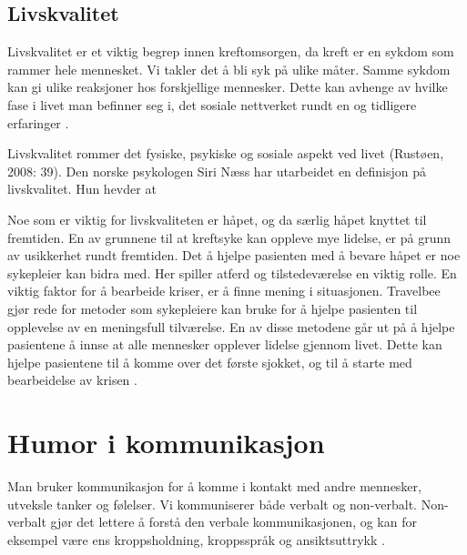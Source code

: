 \subsection{Livskvalitet}

Livskvalitet er et viktig begrep innen kreftomsorgen, da kreft er en sykdom som
rammer hele mennesket. Vi takler det å bli syk på ulike måter. Samme sykdom kan
gi ulike reaksjoner hos forskjellige mennesker. Dette kan avhenge av hvilke
fase i livet man befinner seg i, det sosiale nettverket rundt en og tidligere
erfaringer \cite[s.~39]{rustoen2008}.

Livskvalitet rommer det fysiske, psykiske og sosiale aspekt ved livet (Rustøen,
2008: 39). Den norske psykologen Siri Næss har utarbeidet en definisjon på
livskvalitet. Hun hevder at 

Noe som er viktig for livskvaliteten er håpet, og da særlig håpet knyttet til
fremtiden. En av grunnene til at kreftsyke kan oppleve mye lidelse, er på grunn
av usikkerhet rundt fremtiden. Det å hjelpe pasienten med å bevare håpet er noe
sykepleier kan bidra med. Her spiller atferd og tilstedeværelse en viktig
rolle. En viktig faktor for å bearbeide kriser, er å finne mening i
situasjonen. Travelbee gjør rede for metoder som sykepleiere kan bruke for å
hjelpe pasienten til opplevelse av en meningsfull tilværelse. En av disse
metodene går ut på å hjelpe pasientene å innse at alle mennesker opplever
lidelse gjennom livet. Dette kan hjelpe pasientene til å komme over det første
sjokket, og til å starte med bearbeidelse av krisen
\cite[s.~40--42]{rustoen2008}.

\section{Humor i kommunikasjon}

Man bruker kommunikasjon for å komme i kontakt med andre mennesker, utveksle
tanker og følelser. Vi kommuniserer både verbalt og non-verbalt. Non-verbalt
gjør det lettere å forstå den verbale kommunikasjonen, og kan for eksempel være
ens kroppsholdning, kroppsspråk og ansiktsuttrykk
\cite[s.~65--67]{reitan2008.kommunikasjon}.

